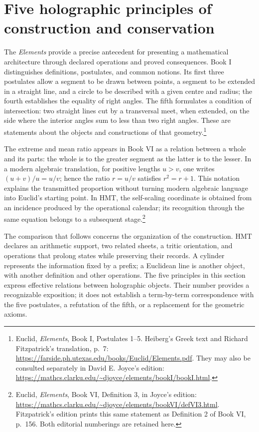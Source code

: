 \section*{Five holographic principles of construction and conservation}

The \emph{Elements} provide a precise antecedent for presenting a
mathematical architecture through declared operations and proved
consequences. Book I distinguishes definitions, postulates, and common notions.
Its first three postulates allow a segment to be drawn between points,
a segment to be extended in a straight line, and a circle to be described with a
given centre and radius; the fourth establishes the equality of right angles.
The fifth formulates a condition of intersection: two straight lines cut by a transversal
meet, when extended, on the side where the interior angles sum to
less than two right angles. These are statements about the objects and constructions of
that geometry.\footnote{Euclid, \emph{Elements}, Book I, Postulates 1--5.
Heiberg's Greek text and Richard Fitzpatrick's translation, p.~7:
\url{https://farside.ph.utexas.edu/books/Euclid/Elements.pdf}. They may also
be consulted separately in David E. Joyce's edition:
\url{https://mathcs.clarku.edu/~djoyce/elements/bookI/bookI.html}.}

The extreme and mean ratio appears in Book VI as a relation between a
whole and its parts: the whole is to the greater segment as the latter is to the lesser.
In a modern algebraic translation, for positive lengths \(u>v\), one writes
\((u+v)/u=u/v\); hence the ratio \(r=u/v\) satisfies
\(r^2=r+1\). This notation explains the transmitted proportion without turning
modern algebraic language into Euclid's starting point. In HMT,
the self-scaling coordinate is obtained from an incidence produced by the
operational calendar; its recognition through the same equation belongs
to a subsequent stage.\footnote{Euclid, \emph{Elements}, Book VI,
Definition 3, in Joyce's edition:
\url{https://mathcs.clarku.edu/~djoyce/elements/bookVI/defVI3.html}.
Fitzpatrick's edition prints this same statement as Definition 2
of Book VI, p.~156. Both editorial numberings are retained here.}

The comparison that follows concerns the organization of the construction.
HMT declares an arithmetic support, two related sheets, a tritic
orientation, and operations that prolong states while preserving their records.
A cylinder represents the information fixed by a prefix; a Euclidean
line is another object, with another definition and other operations. The
five principles in this section express effective relations between
holographic objects. Their number provides a recognizable exposition; it
does not establish a term-by-term correspondence with the five postulates,
a refutation of the fifth, or a replacement for the geometric axioms.

